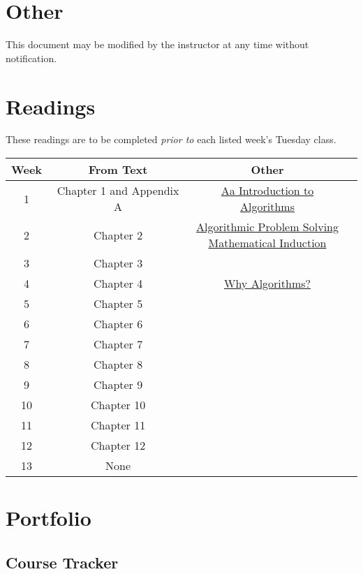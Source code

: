 \documentclass[12pt]{amsart}
\begin{document}
\section{Other}
This document may be modified by the instructor at any time without notification.
\section{Readings}
These readings are to be completed \textit{prior to} each listed week's Tuesday class.

\begin{table}[ht]
\begin{center}
\begin{tabular}{|c|c|c|c|}
	\hline
   \rowcolor[gray]{.9}
	Week & From Text & Other \\
	\hline
	 1 & Chapter 1 and Appendix A & \href{run:./support_files/alg_intro.pdf}{Aa Introduction to Algorithms}\\
	\hline
	 2 & Chapter 2 & \makecell{
	\href{run:./support_files/aps.pdf}{Algorithmic Problem Solving}\\
	\href{run:./support_files/Induction.pdf}{Mathematical Induction}}\\ 
	\hline
	3 & Chapter 3 &\\
	\hline
	4 & Chapter 4 &\href{https://developer.apple.com/videos/play/wwdc2018/223/}{Why Algorithms?}\\
	\hline
	5 & Chapter 5 &\\
	\hline
	6 & Chapter 6 &\\
	\hline
	7 & Chapter 7 &\\
	\hline
	8 & Chapter 8 &\\
	\hline
	9 & Chapter 9 &\\
	\hline
	10 & Chapter 10 &\\
	\hline
	11 & Chapter 11 &\\
	\hline
	12 & Chapter 12 &\\
	\hline
	13 & None &\\
	\hline
\end{tabular}
\end{center}
\end{table}
\newpage
\section{Portfolio}
\subsection{Course Tracker}
\end{document}
